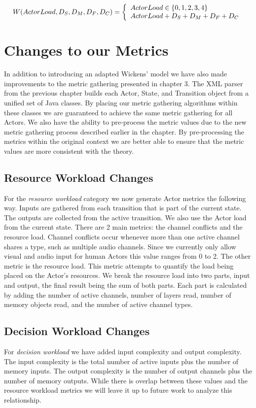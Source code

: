 \begin{equation}
W(ActorLoad, D_{S}, D_{M}, D_{F}, D_{C}) = \left\{ 
  \begin{array}{l l}
    ActorLoad \in \{0,1,2,3,4\}\\
    ActorLoad + D_{S} + D_{M} + D_{F} + D_{C}
  \end{array}
  \right.
  \label{eq:adapted_wickens_model}
\end{equation}


\section{Changes to our Metrics}
In addition to introducing an adapted Wickens' model we have also made improvements to the metric gathering presented in chapter 3.  The XML parser from the previous chapter builds each Actor, State, and Transition object from a unified set of Java classes.  By placing our metric gathering algorithms within these classes we are guaranteed to achieve the same metric gathering for all Actors.  We also have the ability to pre-process the metric values due to the new metric gathering process described earlier in the chapter.  By pre-processing the metrics within the original context we are better able to ensure that the metric values are more consistent with the theory.  

\subsection{Resource Workload Changes}
For the \textit{resource workload} category we now generate Actor metrics the following way.  Inputs are gathered from each transition that is part of the current state.  The outputs are collected from the active transition.  We also use the Actor load from the current state.  There are 2 main metrics: the channel conflicts and the resource load.  Channel conflicts occur whenever more than one active channel shares a type, such as multiple audio channels.  Since we currently only allow visual and audio input for human Actors this value ranges from 0 to 2.  The other metric is the resource load.  This metric attempts to quantify the load being placed on the Actor's resources.  We break the resource load into two parts, input and output, the final result being the sum of both parts.  Each part is calculated by adding the number of active channels, number of layers read, number of memory objects read, and the number of active channel types.

\subsection{Decision Workload Changes}
For \textit{decision workload} we have added input complexity and output complexity.  The input complexity is the total number of active inputs plus the number of memory inputs.  The output complexity is the number of output channels plus the number of memory outputs.  While there is overlap between these values and the resource workload metrics we will leave it up to future work to analyze this relationship.  


